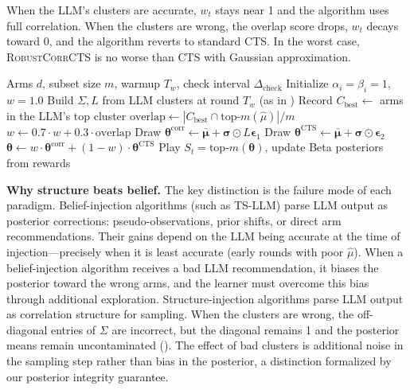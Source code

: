 \documentclass{article}
\theoremstyle{plain}
\theoremstyle{definition}
\theoremstyle{remark}
\newcommand{\RobustCorr}{\textsc{RobustCorrCTS}}
\begin{document}
When the LLM's clusters are accurate, $w_t$ stays near 1 and the algorithm uses full correlation.
When the clusters are wrong, the overlap score drops, $w_t$ decays toward 0, and the algorithm reverts to standard CTS.
In the worst case, \RobustCorr{} is no worse than CTS with Gaussian approximation.

\begin{algorithm}[t]
\caption{\RobustCorr{}: Credibility-Gated Correlated Thompson Sampling}
\label{alg:robust}
\begin{algorithmic}[1]
\REQUIRE Arms $d$, subset size $m$, warmup $T_w$, check interval $\Delta_{\text{check}}$
\STATE Initialize $\alpha_i = \beta_i = 1$, $w = 1.0$
\STATE Build $\Sigma, L$ from LLM clusters at round $T_w$ (as in )
\STATE Record $C_{\text{best}} \gets$ arms in the LLM's top cluster
    \STATE $\text{overlap} \gets |C_{\text{best}} \cap \text{top-}m(\hat\mu)| / m$
    \STATE $w \gets 0.7 \cdot w + 0.3 \cdot \text{overlap}$
  \ENDIF
  \STATE Draw $\boldsymbol{\theta}^{\text{corr}} \gets \bar{\boldsymbol\mu} + \boldsymbol{\sigma} \odot L\boldsymbol{\epsilon}_1$
  \STATE Draw $\boldsymbol{\theta}^{\text{CTS}} \gets \bar{\boldsymbol\mu} + \boldsymbol{\sigma} \odot \boldsymbol{\epsilon}_2$
  \STATE $\boldsymbol{\theta} \gets w \cdot \boldsymbol{\theta}^{\text{corr}} + (1-w) \cdot \boldsymbol{\theta}^{\text{CTS}}$
  \STATE Play $S_t = \text{top-}m(\boldsymbol{\theta})$, update Beta posteriors from rewards
\ENDFOR
\end{algorithmic}
\end{algorithm}

\textbf{Why structure beats belief.}
The key distinction is the failure mode of each paradigm.
Belief-injection algorithms (such as TS-LLM) parse LLM output as posterior corrections: pseudo-observations, prior shifts, or direct arm recommendations.
Their gains depend on the LLM being accurate at the time of injection---precisely when it is least accurate (early rounds with poor $\hat\mu$).
When a belief-injection algorithm receives a bad LLM recommendation, it biases the posterior toward the wrong arms, and the learner must overcome this bias through additional exploration.
Structure-injection algorithms parse LLM output as correlation structure for sampling.
When the clusters are wrong, the off-diagonal entries of $\Sigma$ are incorrect, but the diagonal remains 1 and the posterior means remain uncontaminated ().
The effect of bad clusters is additional noise in the sampling step rather than bias in the posterior, a distinction formalized by our posterior integrity guarantee.
\end{document}
